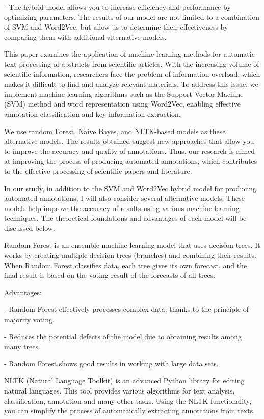 \begin{multicols}{2}
- The hybrid model allows you to increase efficiency and performance by
optimizing parameters. The results of our model are not limited to a
combination of SVM and Word2Vec, but allow us to determine their
effectiveness by comparing them with additional alternative models.

This paper examines the application of machine learning methods for
automatic text processing of abstracts from scientific articles. With
the increasing volume of scientific information, researchers face the
problem of information overload, which makes it difficult to find and
analyze relevant materials. To address this issue, we implement machine
learning algorithms such as the Support Vector Machine (SVM) method and
word representation using Word2Vec, enabling effective annotation
classification and key information extraction.

We use random Forest, Naive Bayes, and NLTK-based models as these
alternative models. The results obtained suggest new approaches that
allow you to improve the accuracy and quality of annotations. Thus, our
research is aimed at improving the process of producing automated
annotations, which contributes to the effective processing of scientific
papers and literature.

In our study, in addition to the SVM and Word2Vec hybrid model for
producing automated annotations, I will also consider several
alternative models. These models help improve the accuracy of results
using various machine learning techniques. The theoretical foundations
and advantages of each model will be discussed below.

Random Forest is an ensemble machine learning model that uses decision
trees. It works by creating multiple decision trees (branches) and
combining their results. When Random Forest classifies data, each tree
gives its own forecast, and the final result is based on the voting
result of the forecasts of all trees.

Advantages:

- Random Forest effectively processes complex data, thanks to the
principle of majority voting.

- Reduces the potential defects of the model due to obtaining results
among many trees.

- Random Forest shows good results in working with large data sets.

NLTK (Natural Language Toolkit) is an advanced Python library for
editing natural languages. This tool provides various algorithms for
text analysis, classification, annotation and many other tasks. Using
the NLTK functionality, you can simplify the process of automatically
extracting annotations from texts.


\end{multicols}
